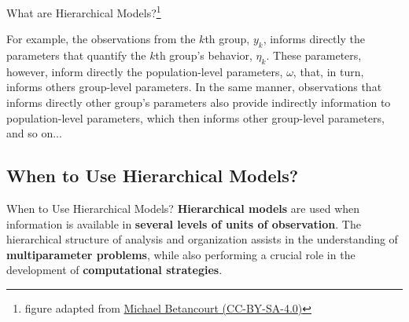 \begin{frame}{What are Hierarchical Models?\footnote{figure adapted from \href{https://betanalpha.github.io/assets/case_studies/hierarchical_modeling.html}{Michael Betancourt (CC-BY-SA-4.0)}}}
\begin{adjustbox}{max width=1.0\textwidth}
	\end{adjustbox}

	\footnotesize
	For example, the observations from the $k$th group, $y_k$,
	informs directly the parameters that quantify the $k$th group's behavior,
	$\eta_k$.
	These parameters, however, inform directly the population-level parameters,
	$\omega$, that, in turn, informs others group-level parameters.
	In the same manner, observations that informs directly other group's parameters
	also provide indirectly information to population-level parameters,
	which then informs other group-level parameters, and so on...
\end{frame}

\subsection{When to Use Hierarchical Models?}
\begin{frame}{When to Use Hierarchical Models?}
	\textbf{Hierarchical models} are used when information is available in
	\textbf{several levels of units of observation}.
	The hierarchical structure of analysis and organization assists in the
	understanding of \textbf{multiparameter problems},
	while also performing a crucial role in the development of
	\textbf{computational strategies}.
\end{frame}

